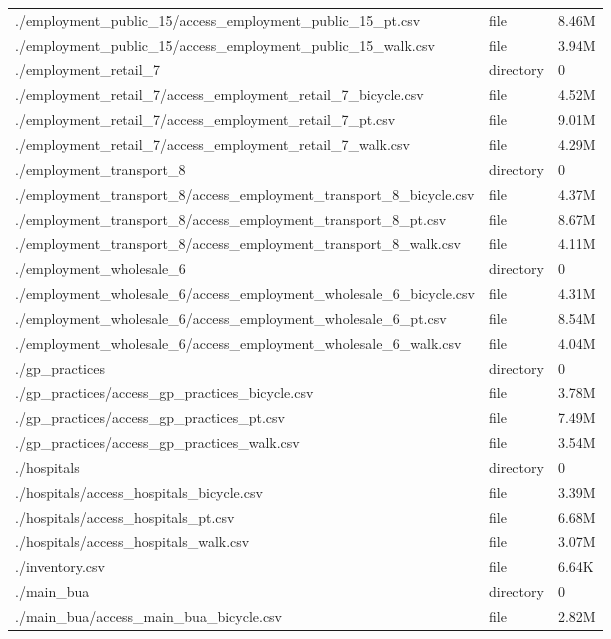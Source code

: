 \documentclass{article}
\begin{document}
\begin{longtable}[t]{>{\raggedright\arraybackslash}p{13cm}ll}
./employment\_public\_15/access\_employment\_public\_15\_pt.csv & file & 8.46M\\
./employment\_public\_15/access\_employment\_public\_15\_walk.csv & file & 3.94M\\
./employment\_retail\_7 & directory & 0\\
\addlinespace
./employment\_retail\_7/access\_employment\_retail\_7\_bicycle.csv & file & 4.52M\\
./employment\_retail\_7/access\_employment\_retail\_7\_pt.csv & file & 9.01M\\
./employment\_retail\_7/access\_employment\_retail\_7\_walk.csv & file & 4.29M\\
./employment\_transport\_8 & directory & 0\\
./employment\_transport\_8/access\_employment\_transport\_8\_bicycle.csv & file & 4.37M\\
\addlinespace
./employment\_transport\_8/access\_employment\_transport\_8\_pt.csv & file & 8.67M\\
./employment\_transport\_8/access\_employment\_transport\_8\_walk.csv & file & 4.11M\\
./employment\_wholesale\_6 & directory & 0\\
./employment\_wholesale\_6/access\_employment\_wholesale\_6\_bicycle.csv & file & 4.31M\\
./employment\_wholesale\_6/access\_employment\_wholesale\_6\_pt.csv & file & 8.54M\\
\addlinespace
./employment\_wholesale\_6/access\_employment\_wholesale\_6\_walk.csv & file & 4.04M\\
./gp\_practices & directory & 0\\
./gp\_practices/access\_gp\_practices\_bicycle.csv & file & 3.78M\\
./gp\_practices/access\_gp\_practices\_pt.csv & file & 7.49M\\
./gp\_practices/access\_gp\_practices\_walk.csv & file & 3.54M\\
\addlinespace
./hospitals & directory & 0\\
./hospitals/access\_hospitals\_bicycle.csv & file & 3.39M\\
./hospitals/access\_hospitals\_pt.csv & file & 6.68M\\
./hospitals/access\_hospitals\_walk.csv & file & 3.07M\\
./inventory.csv & file & 6.64K\\
\addlinespace
./main\_bua & directory & 0\\
./main\_bua/access\_main\_bua\_bicycle.csv & file & 2.82M\\

\end{longtable}
\end{document}
